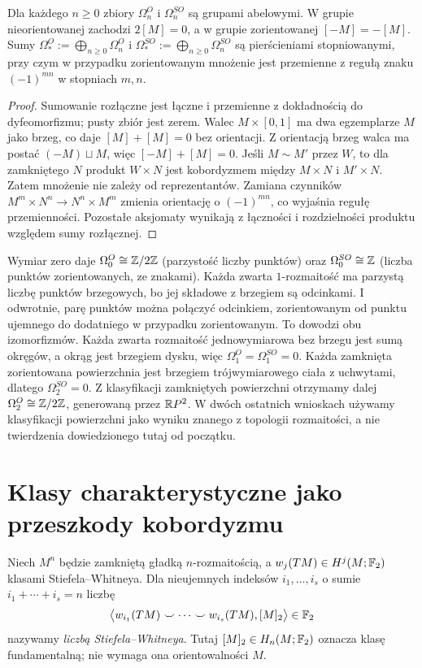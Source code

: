 \begin{stwierdzenie}
\label{prop:bordism-group-v9}
Dla każdego $n\ge0$ zbiory $\Omega_n^O$ i
$\Omega_n^{SO}$ są grupami abelowymi. W grupie
nieorientowanej zachodzi $2[M]=0$, a w grupie
zorientowanej $[-M]=-[M]$. Sumy
$\Omega_*^O:=\bigoplus_{n\ge0}\Omega_n^O$
i $\Omega_*^{SO}:=\bigoplus_{n\ge0}\Omega_n^{SO}$
są pierścieniami stopniowanymi, przy czym
w przypadku zorientowanym mnożenie jest
przemienne z regułą znaku $(-1)^{mn}$ w stopniach
$m,n$.
\end{stwierdzenie}
\begin{proof}
Sumowanie rozłączne jest łączne i przemienne z
dokładnością do dyfeomorfizmu; pusty zbiór jest
zerem. Walec $M\times[0,1]$ ma dwa egzemplarze
$M$ jako brzeg, co daje $[M]+[M]=0$ bez orientacji.
Z orientacją brzeg walca ma postać $(-M)\sqcup M$,
więc $[-M]+[M]=0$. Jeśli $M\sim M'$ przez $W$,
to dla zamkniętego $N$ produkt $W\times N$ jest
kobordyzmem między $M\times N$ i $M'\times N$.
Zatem mnożenie nie zależy od reprezentantów.
Zamiana czynników $M^m\times N^n\to N^n\times M^m$
zmienia orientację o $(-1)^{mn}$, co wyjaśnia
regułę przemienności. Pozostałe aksjomaty wynikają
z łączności i rozdzielności produktu względem
sumy rozłącznej.
\end{proof}

\begin{przyklad}
\label{ex:bordism-low-v9}
Wymiar zero daje $\Omega_0^O\cong\mathbb{Z}/2\mathbb{Z}$
(parzystość liczby punktów) oraz
$\Omega_0^{SO}\cong\mathbb{Z}$ (liczba punktów zorientowanych,
ze znakami). Każda zwarta $1$-rozmaitość ma parzystą
liczbę punktów brzegowych, bo jej składowe z brzegiem są
odcinkami. I odwrotnie, parę punktów można połączyć
odcinkiem, zorientowanym od punktu ujemnego do dodatniego
w przypadku zorientowanym. To dowodzi obu izomorfizmów. Każda zwarta rozmaitość jednowymiarowa
bez brzegu jest sumą okręgów, a okrąg jest brzegiem
dysku, więc $\Omega_1^O=\Omega_1^{SO}=0$.
Każda zamknięta zorientowana powierzchnia jest brzegiem
trójwymiarowego ciała z uchwytami, dlatego
$\Omega_2^{SO}=0$. Z klasyfikacji zamkniętych
powierzchni otrzymamy dalej
$\Omega_2^O\cong\mathbb{Z}/2\mathbb{Z}$, generowaną przez
$\mathbb{R} P^2$. W dwóch ostatnich wnioskach używamy
klasyfikacji powierzchni jako wyniku znanego z
topologii rozmaitości, a nie twierdzenia dowiedzionego
tutaj od początku.
\end{przyklad}

\section{Klasy charakterystyczne jako przeszkody kobordyzmu}
\begin{definicja}
Niech $M^n$ będzie zamkniętą gładką $n$-rozmaitością,
a $w_j(TM)\in H^j(M;\mathbb{F}_2)$ klasami Stiefela--Whitneya.
Dla nieujemnych indeksów $i_1,\ldots,i_s$ o sumie
$i_1+\cdots+i_s=n$ liczbę
\[
\bigl\langle w_{i_1}(TM)\smile\cdots\smile
w_{i_s}(TM),[M]_2\bigr\rangle\in\mathbb{F}_2
\]
nazywamy \emph{liczbą Stiefela--Whitneya}.
Tutaj $[M]_2\in H_n(M;\mathbb{F}_2)$ oznacza klasę fundamentalną;
nie wymaga ona orientowalności $M$.
\end{definicja}

